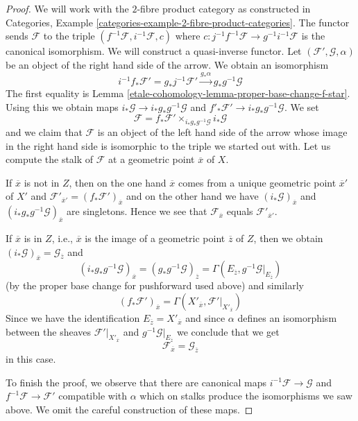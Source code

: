 \begin{proof}
We will work with the $2$-fibre product category as constructed in
Categories, Example \ref{categories-example-2-fibre-product-categories}.
The functor sends $\mathcal{F}$ to the triple
$(f^{-1}\mathcal{F}, i^{-1}\mathcal{F}, c)$ where
$c : j^{-1}f^{-1}\mathcal{F} \to g^{-1}i^{-1}\mathcal{F}$
is the canonical isomorphism. We will construct a quasi-inverse functor. Let
$(\mathcal{F}', \mathcal{G}, \alpha)$ be an object
of the right hand side of the arrow.
We obtain an isomorphism
$$
i^{-1}f_*\mathcal{F}' = g_*j^{-1}\mathcal{F}'
\xrightarrow{g_*\alpha}
g_*g^{-1}\mathcal{G}
$$
The first equality is Lemma \ref{etale-cohomology-lemma-proper-base-change-f-star}.
Using this we obtain maps
$i_*\mathcal{G} \to i_*g_*g^{-1}\mathcal{G}$
and $f'_*\mathcal{F}' \to i_*g_*g^{-1}\mathcal{G}$. We set
$$
\mathcal{F} = f_*\mathcal{F}' \times_{i_*g_*g^{-1}\mathcal{G}} i_*\mathcal{G}
$$
and we claim that $\mathcal{F}$ is an object of the left hand side
of the arrow whose image in the right hand side is isomorphic to
the triple we started out with. Let us compute the stalk of $\mathcal{F}$
at a geometric point $\overline{x}$ of $X$.

\medskip\noindent
If $\overline{x}$ is not
in $Z$, then on the one hand $\overline{x}$ comes from a unique
geometric point $\overline{x}'$ of $X'$ and
$\mathcal{F}'_{\overline{x}'} = (f_*\mathcal{F}')_{\overline{x}}$
and on the other hand we have $(i_*\mathcal{G})_{\overline{x}}$
and $(i_*g_*g^{-1}\mathcal{G})_{\overline{x}}$ are singletons.
Hence we see that $\mathcal{F}_{\overline{x}}$ equals
$\mathcal{F}'_{\overline{x}'}$.

\medskip\noindent
If $\overline{x}$ is in $Z$, i.e., $\overline{x}$ is the image of
a geometric point $\overline{z}$ of $Z$, then we obtain
$(i_*\mathcal{G})_{\overline{x}} = \mathcal{G}_{\overline{z}}$
and
$$
(i_*g_*g^{-1}\mathcal{G})_{\overline{x}} =
(g_*g^{-1}\mathcal{G})_{\overline{z}} =
\Gamma(E_{\overline{z}}, g^{-1}\mathcal{G}|_{E_{\overline{z}}})
$$
(by the proper base change for pushforward used above)
and similarly
$$
(f_*\mathcal{F}')_{\overline{x}} =
\Gamma(X'_{\overline{x}}, \mathcal{F}'|_{X'_{\overline{x}}})
$$
Since we have the identification
$E_{\overline{z}} = X'_{\overline{x}}$ and since $\alpha$
defines an isomorphism between the sheaves
$\mathcal{F}'|_{X'_{\overline{x}}}$ and
$g^{-1}\mathcal{G}|_{E_{\overline{z}}}$
we conclude that we get
$$
\mathcal{F}_{\overline{x}} = \mathcal{G}_{\overline{z}}
$$
in this case.

\medskip\noindent
To finish the proof, we observe that there are canonical maps
$i^{-1}\mathcal{F} \to \mathcal{G}$ and $f^{-1}\mathcal{F} \to \mathcal{F}'$
compatible with $\alpha$ which on stalks produce the isomorphisms
we saw above. We omit the careful construction of these maps.
\end{proof}

